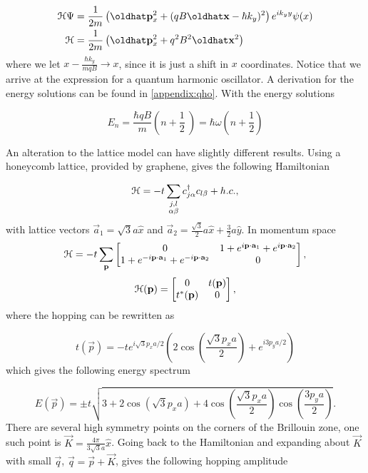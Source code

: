 \begin{align}
  \ham\Psi &= \dfrac{1}{2m} \left( \op{p}_x^2 + (qB \op{x} - \hbar k_y)^2 \right)e^{ik_y y} \psi(x) \nonumber \\
  \ham & = \dfrac{1}{2m} \left( \op{p}_x^2 + q^2 B^2 \op{x}^2 \right)
\end{align}
where we let $x - \tfrac{\hbar k_y}{mqB} \rightarrow x$, since it is just a shift in $x$ coordinates.
Notice that we arrive at the expression for a quantum harmonic oscillator.
A derivation for the energy solutions can be found in \ref{appendix:qho}.
With the energy solutions

\begin{equation}
  E_n = \dfrac{\hbar q B}{m} \left(n+\dfrac{1}{2}\ \right) = \hbar \omega \left(n + \dfrac{1}{2} \right)
\end{equation}

An alteration to the lattice model can have slightly different results.
Using a honeycomb lattice, provided by graphene, gives the following Hamiltonian

\begin{equation}
  \mathcal{H} = -t \sum_{\substack{j, l \\ \alpha \beta}} c^{\dagger}_{j\alpha} c_{l\beta} + h.c.,
\end{equation}
with lattice vectors $\vec{a}_1 = \sqrt{3} a \hat{x}$ and $\vec{a}_2 = \tfrac{\sqrt{3}}{2} a \hat{x} + \tfrac{3}{2} a \hat{y}$.
In momentum space
\[
  \mathcal{H} = -t \sum_{\mathbf{p}}
  \begin{bmatrix}
    0 & 1 + e^{i\mathbf{p}\cdot \mathbf{a}_1 } + e^{i \mathbf{p}\cdot \mathbf{a}_2} \\
    1 + e^{-i\mathbf{p}\cdot \mathbf{a}_1 } + e^{-i \mathbf{p}\cdot \mathbf{a}_2} & 0
  \end{bmatrix},
\]
\[
  \mathcal{H}(\mathbf{p}) =
  \begin{bmatrix}
    0 & t(\mathbf{p}) \\
    t^*(\mathbf{p}) & 0
  \end{bmatrix},
\]
where the hopping can be rewritten as

\begin{equation}
  t(\vec{p}) = -t e^{i\sqrt{3} p_x a / 2} \left( 2\cos{\left( \dfrac{\sqrt{3} p_x a }{ 2 } \right)} + e^{i 3 p_y a /2 } \right)
\end{equation}
which gives the following energy spectrum

\begin{equation}
  E(\vec{p}) = \pm t \sqrt{3 + 2\cos{\left(\sqrt{3}p_x a\right)} + 4\cos{\left(\dfrac{\sqrt{3}p_x a}{2}\right)}\cos{\left(\dfrac{3p_y a}{2}\right)} }.
\end{equation}
There are several high symmetry points on the corners of the Brillouin zone, one such point is $\vec{K} = \tfrac{4\pi}{3\sqrt{3}a} \hat{x} $.
Going back to the Hamiltonian and expanding about $\vec{K}$ with small $\vec{q}$, $\vec{q} = \vec{p} + \vec{K}$, gives the following hopping amplitude

